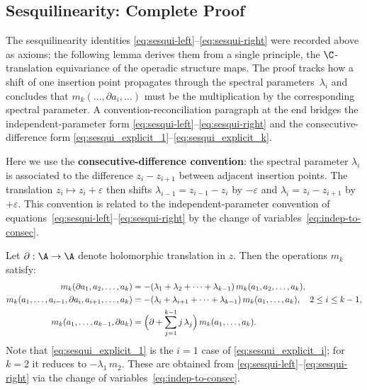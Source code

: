 \subsection{Sesquilinearity: Complete Proof}

The sesquilinearity identities
\eqref{eq:sesqui-left}--\eqref{eq:sesqui-right} were recorded
above as axioms; the following lemma derives them from a single
principle, the $\C$-translation equivariance of the operadic
structure maps. The proof tracks how a shift of one insertion
point propagates through the spectral parameters~$\lambda_i$ and
concludes that $m_k(\ldots,\partial a_i,\ldots)$ must be the
multiplication by the corresponding spectral parameter. A
convention-reconciliation paragraph at the end bridges the
independent-parameter form
\eqref{eq:sesqui-left}--\eqref{eq:sesqui-right} and the
consecutive-difference form
\eqref{eq:sesqui_explicit_1}--\eqref{eq:sesqui_explicit_k}.

\begin{lemma}
\label{lem:sesquilinearity_explicit}
Here we use the \textbf{consecutive-difference convention}: the spectral
parameter $\lambda_i$ is associated to the difference $z_i - z_{i+1}$
between adjacent insertion points. The translation $z_i\mapsto z_i+\varepsilon$
then shifts $\lambda_{i-1} = z_{i-1}-z_i$ by $-\varepsilon$ and
$\lambda_i = z_i - z_{i+1}$ by $+\varepsilon$.
This convention is related to the independent-parameter convention of
equations~\eqref{eq:sesqui-left}--\eqref{eq:sesqui-right} by the
change of variables~\eqref{eq:indep-to-consec}.

Let $\partial : \A \to \A$ denote holomorphic translation in $z$. Then the operations $m_k$ satisfy:
\begin{align}
\label{eq:sesqui_explicit_1}
m_k(\partial a_1, a_2, \ldots, a_k)
 &= -(\lambda_1 + \lambda_2 + \cdots + \lambda_{k-1})\, m_k(a_1, a_2, \ldots, a_k),\\
\label{eq:sesqui_explicit_i}
m_k(a_1, \ldots, a_{i-1}, \partial a_i, a_{i+1}, \ldots, a_k)
 &= -(\lambda_i + \lambda_{i+1} + \cdots + \lambda_{k-1})\, m_k(a_1, \ldots, a_k),
 \quad 2\le i\le k-1,\\
\label{eq:sesqui_explicit_k}
m_k(a_1, \ldots, a_{k-1}, \partial a_k)
 &= \Bigl(\partial + \sum_{j=1}^{k-1} j\,\lambda_j\Bigr)\, m_k(a_1, \ldots, a_k).
\end{align}
Note that \eqref{eq:sesqui_explicit_1} is the $i=1$ case of \eqref{eq:sesqui_explicit_i};
for $k=2$ it reduces to $-\lambda_1\,m_2$.
These are obtained from \eqref{eq:sesqui-left}--\eqref{eq:sesqui-right}
via the change of variables~\eqref{eq:indep-to-consec}.
\end{lemma}

